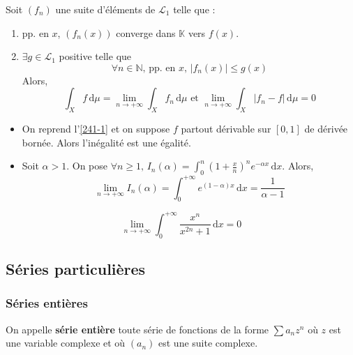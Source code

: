   \begin{theorem}
    Soit $(f_n)$ une suite d'éléments de $\mathcal{L}_1$ telle que :
    \begin{enumerate}[label={\bfseries(\roman*)}]
      \item pp. en $x$, $(f_n(x))$ converge dans $\mathbb{K}$ vers $f(x)$.
      \item $\exists g \in \mathcal{L}_1$ positive telle que
      \[ \forall n \in \mathbb{N}, \, \text{pp. en } x, \, \vert f_n(x) \vert \leq g(x) \]
      Alors,
      \[ \int_X f \, \mathrm{d}\mu = \lim_{n \rightarrow +\infty} \int_X f_n \, \mathrm{d}\mu \text{ et } \lim_{n \rightarrow +\infty} \int_X \vert f_n - f \vert \, \mathrm{d}\mu = 0 \]
    \end{enumerate}
  \end{theorem}

  \begin{example}
    \begin{itemize}
      \item On reprend l'\cref{241-1} et on suppose $f$ partout dérivable sur $[0,1]$ de dérivée bornée. Alors l'inégalité est une égalité.
      \item Soit $\alpha > 1$. On pose $\forall n \geq 1, \, I_n(\alpha) = \int_0^n \left( 1 + \frac{x}{n} \right)^n e^{-\alpha x} \, \mathrm{d}x$. Alors,
      \[ \lim_{n \rightarrow +\infty} I_n(\alpha) = \int_0^{+\infty} e^{(1-\alpha)x} \, \mathrm{d}x = \frac{1}{\alpha - 1} \]
    \end{itemize}
  \end{example}


  \begin{example}
    \[ \lim_{n \rightarrow +\infty} \int_{0}^{+\infty} \frac{x^n}{x^{2n} + 1} \, \mathrm{d}x = 0 \]
  \end{example}

  \subsection{Séries particulières}

  \subsubsection{Séries entières}


  \begin{definition}
    On appelle \textbf{série entière} toute série de fonctions de la forme $\sum a_n z^n$ où $z$ est une variable complexe et où $(a_n)$ est une suite complexe.
  \end{definition}

